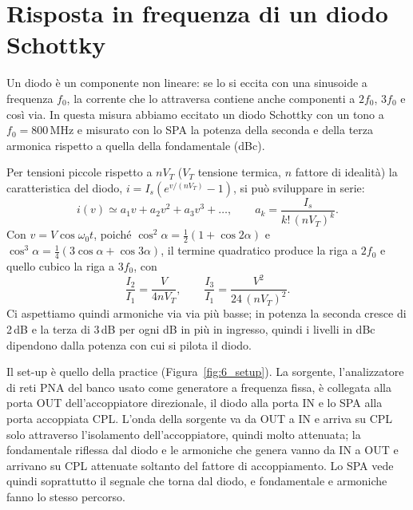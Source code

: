 \documentclass[11pt,a4paper,oneside]{book}
\begin{document}
\chapter{Risposta in frequenza di un diodo Schottky}
\label{cap:diodo}
Un diodo è un componente non lineare: se lo si eccita con una sinusoide a frequenza $f_0$, la corrente che lo attraversa contiene anche componenti a $2f_0$, $3f_0$ e così via. In questa misura abbiamo eccitato un diodo Schottky con un tono a $f_0 = 800$\,MHz e misurato con lo SPA la potenza della seconda e della terza armonica rispetto a quella della fondamentale (dBc).

Per tensioni piccole rispetto a $nV_T$ ($V_T$ tensione termica, $n$ fattore di idealità) la caratteristica del diodo, $i = I_s\left(e^{v/(nV_T)} - 1\right)$, si può sviluppare in serie:
\begin{equation}
i(v) \simeq a_1 v + a_2 v^2 + a_3 v^3 + \dots, \qquad a_k = \frac{I_s}{k!\,(nV_T)^k}.
\end{equation}
Con $v = V\cos\omega_0 t$, poiché $\cos^2\alpha = \frac12(1 + \cos 2\alpha)$ e $\cos^3\alpha = \frac14(3\cos\alpha + \cos 3\alpha)$, il termine quadratico produce la riga a $2f_0$ e quello cubico la riga a $3f_0$, con
\begin{equation}
\frac{I_2}{I_1} = \frac{V}{4nV_T}, \qquad \frac{I_3}{I_1} = \frac{V^2}{24\,(nV_T)^2}.
\label{eq:6_piccolo}
\end{equation}
Ci aspettiamo quindi armoniche via via più basse; in potenza la seconda cresce di 2\,dB e la terza di 3\,dB per ogni dB in più in ingresso, quindi i livelli in dBc dipendono dalla potenza con cui si pilota il diodo.

Il set-up è quello della practice (Figura~\ref{fig:6_setup}). La sorgente, l'analizzatore di reti PNA del banco usato come generatore a frequenza fissa, è collegata alla porta OUT dell'accoppiatore direzionale, il diodo alla porta IN e lo SPA alla porta accoppiata CPL. L'onda della sorgente va da OUT a IN e arriva su CPL solo attraverso l'isolamento dell'accoppiatore, quindi molto attenuata; la fondamentale riflessa dal diodo e le armoniche che genera vanno da IN a OUT e arrivano su CPL attenuate soltanto del fattore di accoppiamento. Lo SPA vede quindi soprattutto il segnale che torna dal diodo, e fondamentale e armoniche fanno lo stesso percorso.
\end{document}
